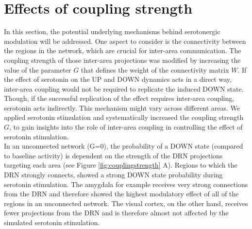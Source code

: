 \section{Effects of coupling strength\label{sec:effcoupling}}
\noindent
\indent In this section, the potential underlying mechanisms behind serotonergic modulation will be addressed. One aspect to consider is the connectivity between the regions in the network, which are crucial for inter-area communication. The coupling strength of those inter-area projections was modified by increasing the value of the parameter $G$ that defines the weight of the connectivity matrix $W$. If the effect of serotonin on the UP and DOWN dynamics acts in a direct way, inter-area coupling would not be required to replicate the induced DOWN state. Though, if the successful replication of the effect requires inter-area coupling, serotonin acts indirectly. This mechanism might vary across different areas. We applied serotonin stimulation and systematically increased the coupling strength $G$, to gain insights into the role of inter-area coupling in controlling the effect of serotonin stimulation. 
\\
\indent In an unconnected network (G=0), the probability of a DOWN state (compared to baseline activity) is dependent on the strength of the DRN projections targeting each area (see Figure \ref{fig:couplingstrength} A). Regions to which the DRN strongly connects, showed a strong DOWN state probability during serotonin stimulation.  The amygdala for example receives very strong connections from the DRN and therefore showed the highest modulatory effect of all of the regions in an unconnected network. The visual cortex, on the other hand, receives fewer projections from the DRN and is therefore almost not affected by the simulated serotonin stimulation. 
\\


